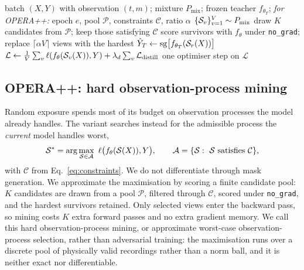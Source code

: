 \begin{algorithm}[t]
\caption{One OPERA training step (OPERA++ adds the bracketed branch)}
\label{alg:opera}
\begin{algorithmic}[1]
\Require batch $(X,Y)$ with observation $(t,m)$; mixture $P_{\mathrm{mix}}$; frozen teacher $f_{\theta_T}$;
\emph{for OPERA++:} epoch $e$, pool $\mathcal{P}$, constraints $\mathcal{C}$, ratio $\alpha$
\State $\{\mathcal{S}_v\}_{v=1}^{V}\sim P_{\mathrm{mix}}$
  \State draw $K$ candidates from $\mathcal{P}$; keep those satisfying $\mathcal{C}$
  \State score survivors with $f_\theta$ under \texttt{no\_grad}; replace $\lceil\alpha V\rceil$ views with the hardest
\EndIf
\State $\hat{Y}_T \gets \mathrm{sg}\big[f_{\theta_T}(\mathcal{S}_{r}(X))\big]$ 
\State $\mathcal{L}\gets\frac1V\sum_v \ell(f_\theta(\mathcal{S}_v(X)),Y) + \lambda_d\sum_v \mathcal{L}_{\mathrm{distill}}$
\State one optimiser step on $\mathcal{L}$
\end{algorithmic}
\end{algorithm}

\subsection{OPERA++: hard observation-process mining}
\label{sec:mining}
Random exposure spends most of its budget on observation processes the model already handles. The variant searches
instead for the admissible process the \emph{current} model handles worst,
\begin{equation}
\Sobs^{*}=\arg\max_{\Sobs\in\mathcal{A}}\ \ell\big(f_\theta(\Sobs(X)),Y\big),
\qquad \mathcal{A}=\{\Sobs:\ \Sobs\ \mathrm{satisfies}\ \mathcal{C}\},
\label{eq:mining}
\end{equation}
with $\mathcal{C}$ from Eq.~\ref{eq:constraints}. We do not differentiate through mask generation. We approximate
the maximisation by scoring a finite candidate pool: $K$ candidates are drawn from a pool $\mathcal{P}$, filtered
through $\mathcal{C}$, scored under \texttt{no\_grad}, and the hardest survivors retained. Only selected views
enter the backward pass, so mining costs $K$ extra forward passes and no extra gradient memory. We call this hard
observation-process mining, or approximate worst-case observation-process selection, rather than adversarial
training: the maximisation runs over a discrete pool of physically valid recordings rather than a norm ball, and it
is neither exact nor differentiable.


